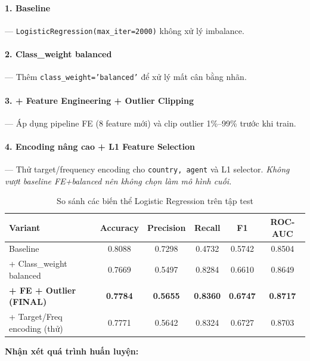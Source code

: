 \documentclass[12pt, a4paper]{article}
\begin{document}
\paragraph{1. Baseline} --- \texttt{LogisticRegression(max\_iter=2000)} không xử lý imbalance.

\paragraph{2. Class\_weight balanced} --- Thêm \texttt{class\_weight='balanced'} để xử lý mất cân bằng nhãn.

\paragraph{3. + Feature Engineering + Outlier Clipping} --- Áp dụng pipeline FE (8 feature mới) và clip outlier 1\%--99\% trước khi train.

\paragraph{4. Encoding nâng cao + L1 Feature Selection} --- Thử target/frequency encoding cho \texttt{country, agent} và L1 selector. \emph{Không vượt baseline FE+balanced nên không chọn làm mô hình cuối.}

\begin{table}[h!]
\centering
\caption{So sánh các biến thể Logistic Regression trên tập test}
\renewcommand{\arraystretch}{1.3}
\begin{tabular}{|l|c|c|c|c|c|}
\hline
\textbf{Variant} & \textbf{Accuracy} & \textbf{Precision} & \textbf{Recall} & \textbf{F1} & \textbf{ROC-AUC} \\ \hline
Baseline                         & 0.8088 & 0.7298 & 0.4732 & 0.5742 & 0.8504 \\ \hline
+ Class\_weight balanced         & 0.7669 & 0.5497 & 0.8284 & 0.6610 & 0.8649 \\ \hline
\textbf{+ FE + Outlier (FINAL)}  & \textbf{0.7784} & \textbf{0.5655} & \textbf{0.8360} & \textbf{0.6747} & \textbf{0.8717} \\ \hline
+ Target/Freq encoding (thử)     & 0.7771 & 0.5642 & 0.8324 & 0.6727 & 0.8703 \\ \hline
\end{tabular}
\end{table}

\textbf{Nhận xét quá trình huấn luyện:}
\end{document}
